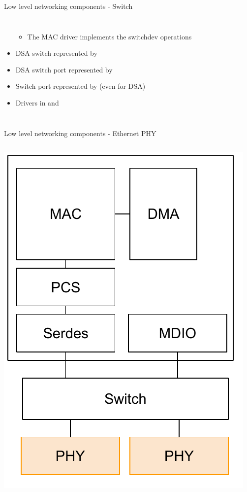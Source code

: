 \begin{frame}{Low level networking components - Switch}
\begin{columns}
\begin{itemize}
				\begin{itemize}
					\item The MAC driver implements the switchdev operations
				\end{itemize}
			\item DSA switch represented by 
			\item DSA switch port represented by 
			\item Switch port represented by  (even for DSA)
			\item Drivers in  and 
		\end{itemize}
	\end{columns}
\end{frame}

\begin{frame}{Low level networking components - Ethernet PHY}
	\begin{columns}
			\includegraphics[width=\textwidth]{slides/networking-driver-overview/net_components_phy.pdf}

\end{columns}
\end{frame}
